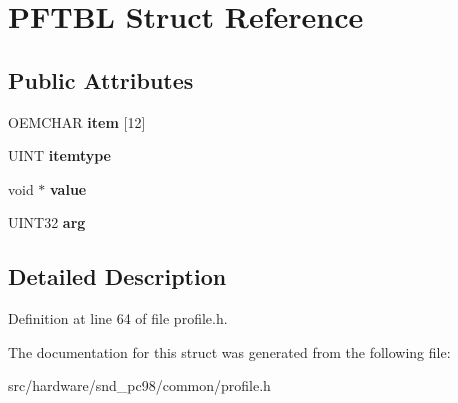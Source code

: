 \hypertarget{structPFTBL}{\section{P\-F\-T\-B\-L Struct Reference}
\label{structPFTBL}
}
\subsection*{Public Attributes}
\begin{DoxyCompactItemize}
\item 
\hypertarget{structPFTBL_ac7820c746bf3ce5b7f37463654d3cb50}{O\-E\-M\-C\-H\-A\-R {\bfseries item} \mbox{[}12\mbox{]}}\label{structPFTBL_ac7820c746bf3ce5b7f37463654d3cb50}

\item 
\hypertarget{structPFTBL_ac5fbb3a1ef0424895da77033bc9f67ff}{U\-I\-N\-T {\bfseries itemtype}}\label{structPFTBL_ac5fbb3a1ef0424895da77033bc9f67ff}

\item 
\hypertarget{structPFTBL_a4e516a4a75121700de00c9b3228b3892}{void $\ast$ {\bfseries value}}\label{structPFTBL_a4e516a4a75121700de00c9b3228b3892}

\item 
\hypertarget{structPFTBL_aa176fa5e756c8abc6bf5712cbbcf6e2a}{U\-I\-N\-T32 {\bfseries arg}}\label{structPFTBL_aa176fa5e756c8abc6bf5712cbbcf6e2a}

\end{DoxyCompactItemize}


\subsection{Detailed Description}


Definition at line 64 of file profile.\-h.



The documentation for this struct was generated from the following file\-:\begin{DoxyCompactItemize}
\item 
src/hardware/snd\-\_\-pc98/common/profile.\-h\end{DoxyCompactItemize}
